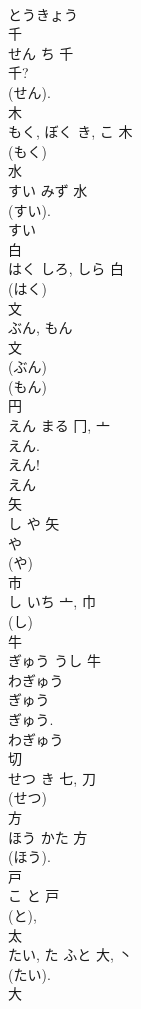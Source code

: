 \documentclass[8pt]{extreport}
\begin{document}
\begin{CJK}{UTF8}{min}
\\	とうきょう 
\\	千	
\\	せん	ち	千	
\\	千? 
\\	(せん). 
\\	木	
\\	もく, ぼく	き, こ	木	
\\	(もく) 
\\	水	
\\	すい	みず	水	
\\	(すい). 
\\	すい 
\\	白	
\\	はく	しろ, しら	白	
\\	(はく) 
\\	文	
\\	ぶん, もん	
\\	文	
\\	(ぶん) 
\\	(もん) 
\\	円	
\\	えん	まる	冂, 亠	
\\	えん. 
\\	えん!
\\	えん 
\\	矢	
\\	し	や	矢	
\\	や 
\\	(や) 
\\	市	
\\	し	いち	亠, 巾	
\\	(し) 
\\	牛	
\\	ぎゅう	うし	牛	
\\	わぎゅう 
\\	ぎゅう 
\\	ぎゅう.	
\\	わぎゅう 
\\	切	
\\	せつ	き	七, 刀	
\\	(せつ) 
\\	方	
\\	ほう	かた	方	
\\	(ほう). 
\\	戸	
\\	こ	と	戸	
\\	(と), 
\\	太	
\\	たい, た	ふと	大, 丶	
\\	(たい).	
\\	大 

\end{CJK}
\end{document}
